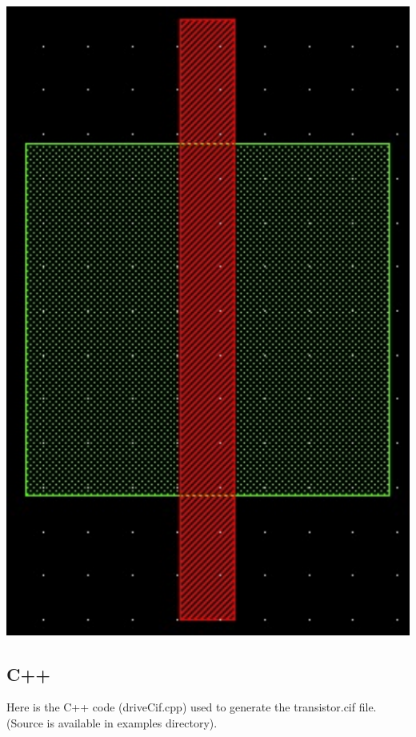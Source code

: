  
\begin{DoxyImage}
\includegraphics[width=.25\linewidth]{transistorCif}
\end{DoxyImage}
\hypertarget{cif_cifC}{}\subsection{C++}\label{cif_cifC}
Here is the C++ code ({\ttfamily drive\+Cif.\+cpp}) used to generate the transistor.\+cif file. (Source is available in examples directory). 
